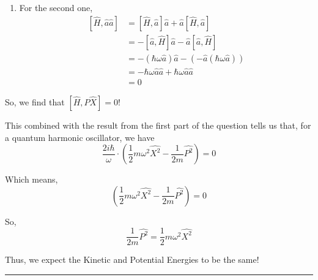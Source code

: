 \documentclass[twoside]{article}
\def\beginrefs{\begin{list}%
        {[\arabic{equation}]}{\usecounter{equation}
         \setlength{\leftmargin}{2.0truecm}\setlength{\labelsep}{0.4truecm}%
         \setlength{\labelwidth}{1.6truecm}}}
\def\endrefs{\end{list}}
\def\bibentry#1{\item[\hbox{[#1]}]}
\begin{document}
\begin{enumerate}
\begin{enumerate}
      \item For the second one, 
      \begin{align*}
         \left[ \hat{H}, \hat{a}\hat{a} \right] &= \left[ \hat{H}, \hat{a} \right]\hat{a} + \hat{a}\left[ \hat{H}, \hat{a}\right] \\
         &= -\left[\hat{a}, \hat{H}  \right]\hat{a} - \hat{a}\left[ \hat{a}, \hat{H} \right] \\
         &= -(\hbar\omega \hat{a}) \hat{a} - \left(-\hat{a}(\hbar\omega \hat{a}) \right) \\
         &= -\hbar\omega \hat{a}\hat{a} + \hbar\omega \hat{a}\hat{a} \\
         &= 0
      \end{align*}
   \end{enumerate}

   So, we find that $\left[ \hat{H}, \hat{P}\hat{X} \right] = 0$!

   This combined with the result from the first part of the question tells us that, for a quantum harmonic oscillator, we have 
   \[ \frac{2 i \hbar}{\omega} \cdot \left( \frac{1}{2} m \omega^2 \hat{X^2} - \frac{1}{2m} \hat{P^2} \right) = 0 \]

   Which means, 
   \[ \left( \frac{1}{2} m \omega^2 \hat{X^2} - \frac{1}{2m} \hat{P^2} \right) = 0\]

   So, 
   \[ \boxed{\frac{1}{2m} \hat{P^2} = \frac{1}{2} m \omega^2 \hat{X^2}} \]

   Thus, we expect the Kinetic and Potential Energies to be the same!
\end{enumerate}

\vskip 0.5cm
\hrule
\vskip 0.5cm


\end{document}
